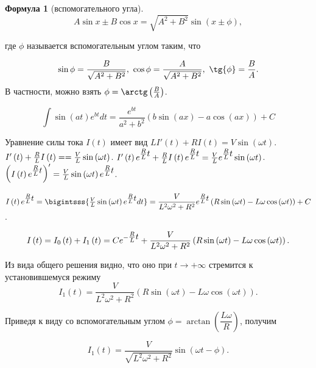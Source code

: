 \documentclass[a5paper,10pt]{article}
\newcommand{\br}[1]{\left(#1\right)}
\theoremstyle{definition}
\newtheorem*{formula}{Формула}
\begin{document}
\begin{framed}
\begin{formula}[вспомогательного угла]
$$A \sin{x} \pm B \cos{x} = \sqrt{A^2 + B^2} \sin\br{x \pm \phi},$$

где $\phi$ называется вспомогательным углом таким, что

$$
\sin{\phi} = \frac {B}{\sqrt{A^2 + B^2}},\ 
\cos{\phi} = \frac {A}{\sqrt{A^2 + B^2}},\
\tg{\phi} = \frac {B}{A}.
$$
В частности, можно взять $\phi = \arctg\br{\frac {B}{A}}$.
\end{formula}
\end{framed}

\begin{framed}
$$\int \sin\br{at} e^{bt} dt = \frac {e^{bt}}{a^2 + b^2} \br{b \sin\br{ax} - a \cos\br{ax}} + C$$
\end{framed}

Уравнение силы тока $I\br{t}$ имеет вид $LI'\br{t} + RI\br{t} = V \sin\br{\omega t}$. 
$I'\br{t} + \frac {R} {L} I\br{t} = \linebreak = \frac {V}{L} \sin\br{\omega t}$.
$I'\br{t} e^{\mathlarger{\frac{R}{L} t}} + \frac {R} {L} I\br{t} e^{\mathlarger{\frac{R}{L} t}} = \frac {V}{L} e^{\mathlarger{\frac{R}{L} t}} \sin\br{\omega t}$. 
$\br{I\br{t} e^{\mathlarger{\frac{R}{L} t}}}' = \frac {V}{L}  \sin\br{\omega t} e^{\mathlarger{\frac{R}{L} t}}$.

$I\br{t} e^{\mathlarger{\frac{R}{L} t}} = \bigintsss{\frac {V}{L} \sin\br{\omega t} e^{\mathlarger{\frac{R}{L} t}} dt} = \dfrac {V}{L^2 \omega^2 + R^2} e^{\mathlarger{\frac {R}{L}t}} \br{R \sin\br{\omega t} - L \omega \cos\br{\omega t}} + C$.

$$I\br{t} = I_{0}\br{t} + I_{1}\br{t} = C e^{-\mathlarger{\frac {R}{L}t}} + \dfrac {V}{L^2 \omega^2 + R^2} \br{R \sin\br{\omega t} - L \omega \cos\br{\omega t}}.$$

Из вида общего решения видно, что оно при $t \to +\infty$ стремится к установившемуся режиму 
$$ I_{1}\br{t} = \dfrac {V}{L^2 \omega^2 + R^2} \br{R \sin\br{\omega t} - L \omega \cos\br{\omega t}}. $$

Приведя к виду со вспомогательным углом $\phi = \arctan\br{\dfrac{L\omega}{R}}$, получим

$$ I_{1}\br{t} = \frac {V}{\sqrt{L^2 \omega^2 + R^2}} \sin\br{\omega t - \phi}. $$
\end{document}
